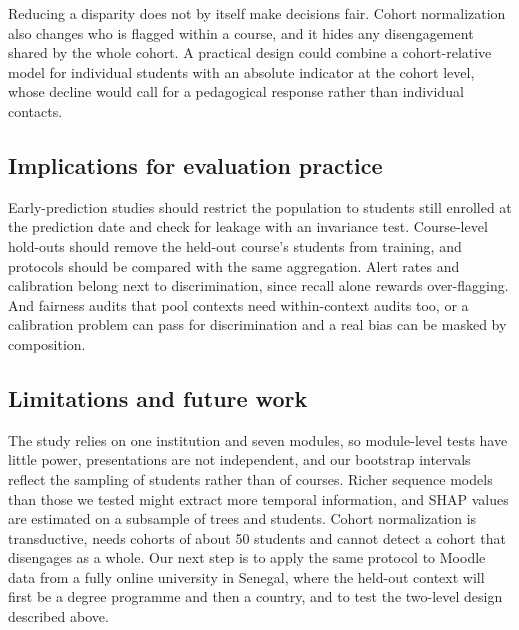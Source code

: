 \documentclass[fleqn,10pt]{JLA_article}
\newif\ifanonymous
\begin{document}
Reducing a disparity does not by itself make decisions fair. Cohort normalization also changes who is flagged within a course, and it hides any disengagement shared by the whole cohort. A practical design could combine a cohort-relative model for individual students with an absolute indicator at the cohort level, whose decline would call for a pedagogical response rather than individual contacts.

\subsection{Implications for evaluation practice}
Early-prediction studies should restrict the population to students still enrolled at the prediction date and check for leakage with an invariance test. Course-level hold-outs should remove the held-out course's students from training, and protocols should be compared with the same aggregation. Alert rates and calibration belong next to discrimination, since recall alone rewards over-flagging. And fairness audits that pool contexts need within-context audits too, or a calibration problem can pass for discrimination and a real bias can be masked by composition.

\subsection{Limitations and future work}
The study relies on one institution and seven modules, so module-level tests have little power, presentations are not independent, and our bootstrap intervals reflect the sampling of students rather than of courses. Richer sequence models than those we tested might extract more temporal information, and SHAP values are estimated on a subsample of trees and students. Cohort normalization is transductive, needs cohorts of about 50 students and cannot detect a cohort that disengages as a whole. Our next step is to apply the same protocol to Moodle data from \ifanonymous another, fully online university\else a fully online university in Senegal\fi, where the held-out context will first be a degree programme and then a country, and to test the two-level design described above.

\end{document}
